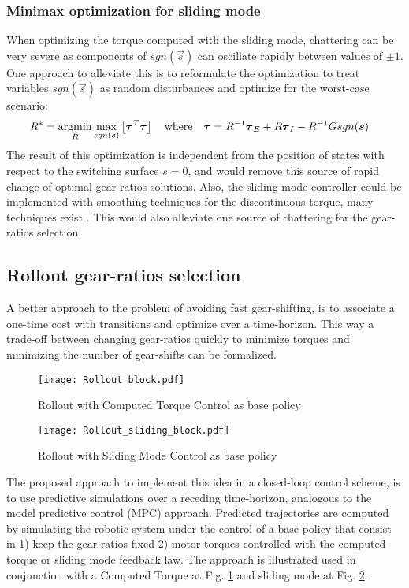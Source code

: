 \subsubsection{Minimax optimization for sliding mode}
\label{sec:minimax}

When optimizing the torque computed with the sliding mode, chattering can be very severe as components of $sgn( \vec{s} )$ can oscillate rapidly between values of $\pm1$. One approach to alleviate this is to reformulate the optimization to treat variables $sgn( \vec{s} )$ as random disturbances and optimize for the worst-case scenario:
%
\begin{align}
R^{*} &= \operatornamewithlimits{argmin}\limits_{R} \operatornamewithlimits{max}\limits_{sgn(\vec{s})} \left[ \vec{\tau}^T\vec{\tau}  \right] \quad\text{where}\quad \vec{\tau} = R^{-1} \vec{\tau}_{E} + R \vec{\tau}_{I} - R^{-1} G sgn( \vec{s} ) 
\end{align} 
%
The result of this optimization is independent from the position of states with respect to the switching surface $s=0$, and would remove this source of rapid change of optimal gear-ratios solutions. Also, the sliding mode controller could be implemented with smoothing techniques for the discontinuous torque, many techniques exist \cite{slotine_applied_1991} \cite{perruquetti_sliding_2002}. This would also alleviate one source of chattering for the gear-ratios selection.

\subsection{Rollout gear-ratios selection}

A better approach to the problem of avoiding fast gear-shifting, is to associate a one-time cost with transitions and optimize over a time-horizon. This way a trade-off between changing gear-ratios quickly to minimize torques and minimizing the number of gear-shifts can be formalized.
%
\begin{figure}[tp]
	\centering
		\texttt{[image: Rollout\_block.pdf]}
	\caption{Rollout with Computed Torque Control as base policy}
	\label{fig:Rollout_block}
\end{figure}
%
\begin{figure}[tp]
	\centering
		\texttt{[image: Rollout\_sliding\_block.pdf]}
	\caption{Rollout with Sliding Mode Control as base policy}
	\label{fig:Rollout_sliding_block}
\end{figure}
%
The proposed approach to implement this idea in a closed-loop control scheme, is to use predictive simulations over a receding time-horizon, analogous to the model predictive control (MPC) approach. Predicted trajectories are computed by simulating the robotic system under the control of a base policy that consist in 1) keep the gear-ratios fixed 2) motor torques controlled with the computed torque or sliding mode feedback law.  The approach is illustrated used in conjunction with a Computed Torque at Fig. \ref{fig:Rollout_block} and sliding mode at Fig. \ref{fig:Rollout_sliding_block}.

